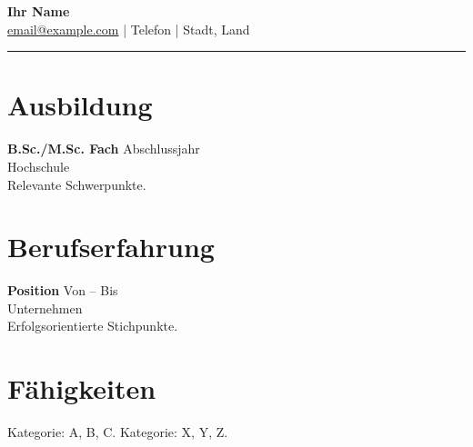 \documentclass[11pt,a4paper]{article}
\begin{document}
\begin{center}
{\LARGE \textbf{Ihr Name}}\\[0.3em]
\href{mailto:email@example.com}{email@example.com} \quad | \quad Telefon \quad | \quad Stadt, Land
\end{center}
\begin{flushright}\rule{2cm}{2.5cm}\end{flushright}
\vspace{0.6em}
\section*{Ausbildung}
\textbf{B.Sc./M.Sc. Fach} \hfill Abschlussjahr \\
Hochschule \\
Relevante Schwerpunkte.

\section*{Berufserfahrung}
\textbf{Position} \hfill Von -- Bis \\
Unternehmen \\
Erfolgsorientierte Stichpunkte.

\section*{Fähigkeiten}
Kategorie: A, B, C. \quad Kategorie: X, Y, Z.
\end{document}
